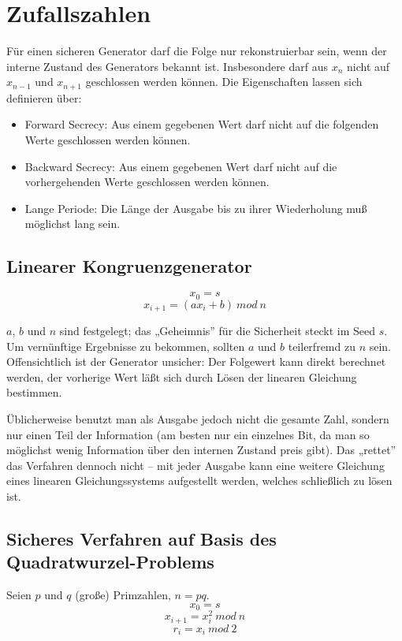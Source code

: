 \chapter{Zufallszahlen}

Für einen sicheren Generator darf die Folge nur rekonstruierbar sein, wenn der interne Zustand des Generators bekannt ist. Insbesondere darf aus $x_n$ nicht auf $x_{n-1}$ und $x_{n+1}$ geschlossen werden können. Die Eigenschaften lassen sich definieren über:

\begin{itemize}
  \item{Forward Secrecy:} Aus einem gegebenen Wert darf nicht auf die folgenden Werte geschlossen werden können.
  \item{Backward Secrecy:} Aus einem gegebenen Wert darf nicht auf die vorhergehenden Werte geschlossen werden können.
  \item{Lange Periode:} Die Länge der Ausgabe bis zu ihrer Wiederholung muß möglichst lang sein.
\end{itemize}

\section{Linearer Kongruenzgenerator}

$$x_0 = s $$
$$x_{i+1} = (a x_i + b)\ mod\ n$$

$a$, $b$ und $n$ sind festgelegt; das „Geheimnis” für die Sicherheit steckt im Seed $s$. Um vernünftige Ergebnisse zu bekommen, sollten $a$ und $b$ teilerfremd zu $n$ sein. Offensichtlich ist der Generator unsicher: Der Folgewert kann direkt berechnet werden, der vorherige Wert läßt sich durch Lösen der linearen Gleichung bestimmen.

Üblicherweise benutzt man als Ausgabe jedoch nicht die gesamte Zahl, sondern nur einen Teil der Information (am besten nur ein einzelnes Bit, da man so möglichst wenig Information über den internen Zustand preis gibt). Das „rettet” das Verfahren dennoch nicht -- mit jeder Ausgabe kann eine weitere Gleichung eines linearen Gleichungssystems aufgestellt werden, welches schließlich zu lösen ist.

\section{Sicheres Verfahren auf Basis des Quadratwurzel-Problems}

Seien $p$ und $q$ (große) Primzahlen, $n=p q$.
$$x_0 = s $$
$$x_{i+1} = x_i^2\ mod\ n$$
$$r_i = x_i\ mod\ 2$$

